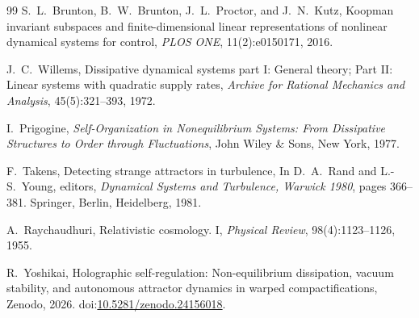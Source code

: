 \documentclass[11pt,a4paper]{article}
\begin{document}
\begin{thebibliography}{99}
S.~L.~Brunton, B.~W.~Brunton, J.~L.~Proctor, and J.~N.~Kutz,
\newblock Koopman invariant subspaces and finite-dimensional linear representations of nonlinear dynamical systems for control,
\newblock \emph{PLOS ONE}, 11(2):e0150171, 2016.

J.~C.~Willems,
\newblock Dissipative dynamical systems part I: General theory; Part II: Linear systems with quadratic supply rates,
\newblock \emph{Archive for Rational Mechanics and Analysis}, 45(5):321--393, 1972.

I.~Prigogine,
\newblock \emph{Self-Organization in Nonequilibrium Systems: From Dissipative Structures to Order through Fluctuations},
\newblock John Wiley \& Sons, New York, 1977.

F.~Takens,
\newblock Detecting strange attractors in turbulence,
\newblock In D.~A.~Rand and L.-S.~Young, editors, \emph{Dynamical Systems and Turbulence, Warwick 1980}, pages 366--381. Springer, Berlin, Heidelberg, 1981.

A.~Raychaudhuri,
\newblock Relativistic cosmology. I,
\newblock \emph{Physical Review}, 98(4):1123--1126, 1955.

R.~Yoshikai,
\newblock Holographic self-regulation: Non-equilibrium dissipation, vacuum stability, and autonomous attractor dynamics in warped compactifications,
\newblock Zenodo, 2026. doi:\href{https://doi.org/10.5281/zenodo.24156018}{10.5281/zenodo.24156018}.

\end{thebibliography}
\end{document}
